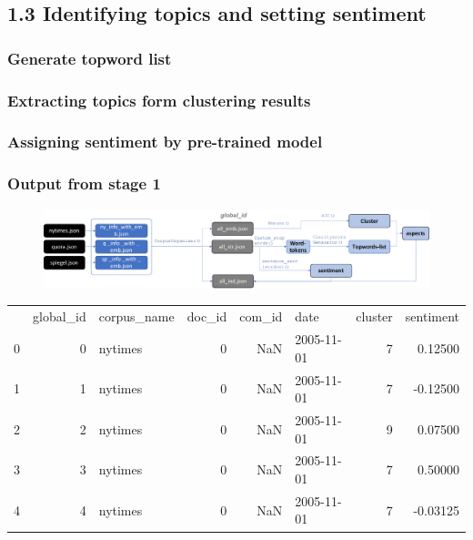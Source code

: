 \documentclass{tum-presentation}
\begin{document}
\subsection{1.3 Identifying topics and setting sentiment}
\subsubsection{Generate topword list}%
\subsubsection{Extracting topics form clustering results}
\subsubsection{Assigning sentiment by pre-trained model}


\begin{frame}
  \frametitle{Output from stage 1}
    
  \begin{figure}[t]
    \includegraphics[width = \textwidth]{figures/journey.pdf}
    \end{figure}

\begin{tabular}{lrlrrlrr}
  {} &  global\_id & corpus\_name &  doc\_id &  com\_id &        date &  cluster &  sentiment \\
  
  0 &          0 &     nytimes &       0 &     NaN &  2005-11-01 &        7 &    0.12500 \\
  1 &          1 &     nytimes &       0 &     NaN &  2005-11-01 &        7 &   -0.12500 \\
  2 &          2 &     nytimes &       0 &     NaN &  2005-11-01 &        9 &    0.07500 \\
  3 &          3 &     nytimes &       0 &     NaN &  2005-11-01 &        7 &    0.50000 \\
  4 &          4 &     nytimes &       0 &     NaN &  2005-11-01 &        7 &   -0.03125 \\
 
  \end{tabular}
\end{frame}
\end{document}
